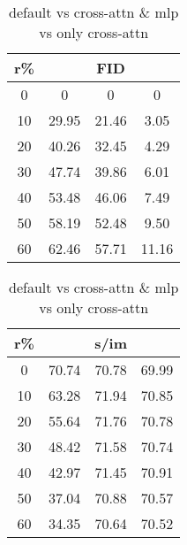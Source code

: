 \begin{table}[htp]
\caption{default vs cross-attn \& mlp vs only cross-attn}
    \begin{minipage}{0.48\textwidth}
        \centering
        \begin{tabular}{|c||c|c|c|}
            \hline
            \multicolumn{1}{|c||}{r\%} & \multicolumn{3}{c|}{FID}\\
            \hline
            0 & 0 & 0 & 0 \\
            10 & 29.95 & 21.46 & 3.05 \\
            20 & 40.26 & 32.45 & 4.29 \\
            30 & 47.74 & 39.86 & 6.01 \\
            40 & 53.48 & 46.06 & 7.49 \\
            50 & 58.19 & 52.48 & 9.50 \\
            60 & 62.46 & 57.71 & 11.16 \\
            \hline
        \end{tabular}
    \end{minipage}
    \hfill
    \begin{minipage}{0.48\textwidth}
        \centering
        \begin{tabular}{|c||c|c|c|}
            \hline
            \multicolumn{1}{|c||}{r\%} & \multicolumn{3}{c|}{s/im}\\
            \hline
            0 & 70.74 & 70.78 & 69.99 \\
            10 & 63.28 & 71.94 & 70.85 \\
            20 & 55.64 & 71.76 & 70.78 \\
            30 & 48.42 & 71.58 & 70.74 \\
            40 & 42.97 & 71.45 & 70.91 \\
            50 & 37.04 & 70.88 & 70.57 \\
            60 & 34.35 & 70.64 & 70.52 \\
            \hline
        \end{tabular}
    \end{minipage}
\end{table}